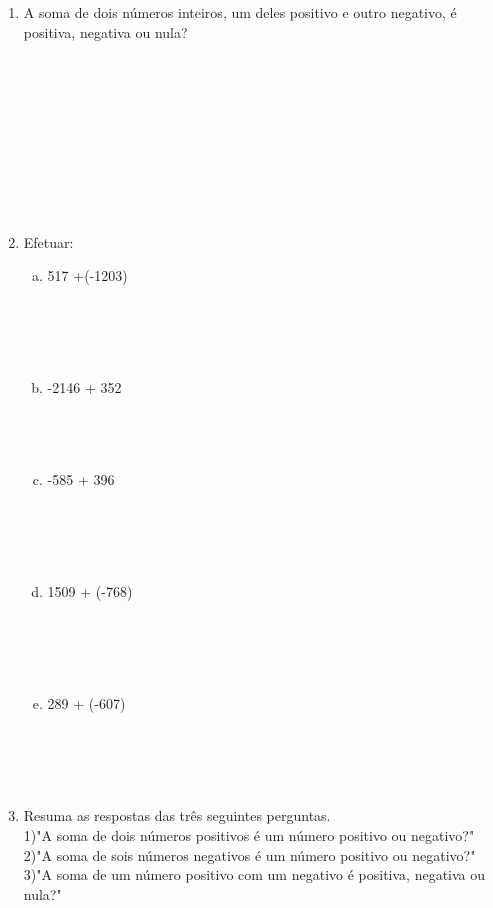 \documentclass[a4paper,14pt]{article}
\begin{document}
\begin{multicols}{2}
\begin{enumerate}
\begin{enumerate}[a)]
    		\end{enumerate}
    		\item A soma de dois números inteiros, um deles positivo e outro negativo, é positiva, negativa ou nula? \\\\\\\\\\\\\\\\\\\\
    		\item Efetuar:
    		\begin{enumerate}[a)]
    			\item 517 +(-1203) \\\\\\\\\\
    			\item -2146 + 352 \\\\\\\\
    			\item -585 + 396 \\\\\\\\\\
    			\item 1509 + (-768) \\\\\\\\\\
    			\item 289 + (-607) \\\\\\\\\\
    		\end{enumerate}
    		\item Resuma as respostas das três seguintes perguntas. \\
    		1)"A soma de dois números positivos é um número positivo ou negativo?" \\
    		2)"A soma de sois números negativos é um número positivo ou negativo?" \\
    		3)"A soma de um número positivo com um negativo é positiva, negativa ou nula?" \\\\\\\\\\\\\\\\\\\\\\

\end{enumerate}
\end{multicols}
\end{document}

